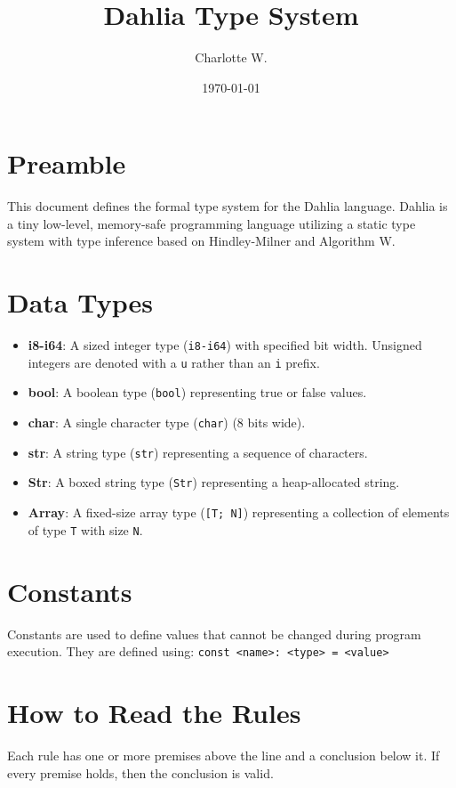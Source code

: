 \documentclass[11pt]{article}
\title{Dahlia Type System}
\author{Charlotte W.}
\date{\today}
\begin{document}
\maketitle

\section{Preamble}
This document defines the formal type system for the Dahlia language.
Dahlia is a tiny low-level, memory-safe programming language utilizing a static type system with type inference based on Hindley-Milner and Algorithm W.

\section{Data Types}
\begin{itemize}
    \item \textbf{i8-i64}: A sized integer type (\texttt{i8-i64}) with specified bit width. Unsigned integers are denoted with a \texttt{u} rather than an \texttt{i} prefix.
    \item \textbf{bool}: A boolean type (\texttt{bool}) representing true or false values.
    \item \textbf{char}: A single character type (\texttt{char}) (8 bits wide).
    \item \textbf{str}: A string type (\texttt{str}) representing a sequence of characters.
    \item \textbf{Str}: A boxed string type (\texttt{Str}) representing a heap-allocated string.
    \item \textbf{Array}: A fixed-size array type (\texttt{[T; N]}) representing a collection of elements of type \texttt{T} with size \texttt{N}.
\end{itemize}


\section{Constants}
Constants are used to define values that cannot be changed during program execution.
They are defined using: \texttt{const <name>: <type> = <value>}

\section{How to Read the Rules}
Each rule has one or more premises above the line and a conclusion below it. If every premise holds, then the conclusion is valid.
\end{document}
